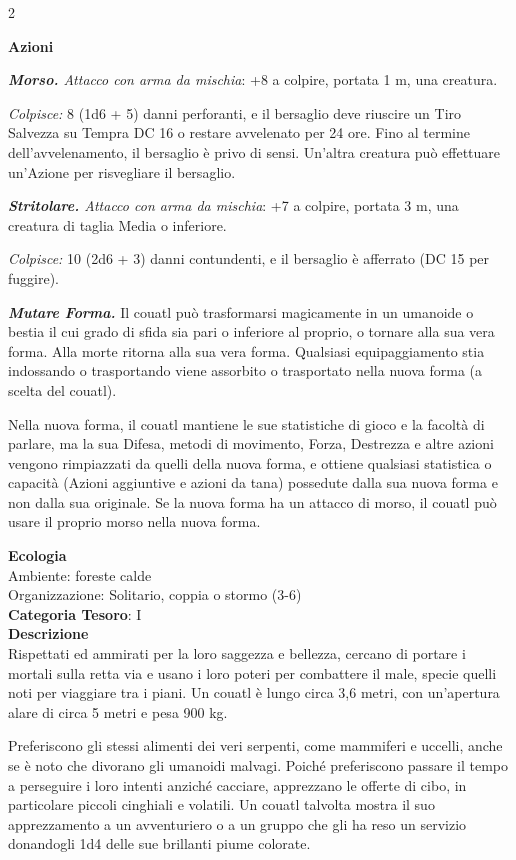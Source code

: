 \begin{multicols}{2}
{\textbf{Azioni}

\emph{\textbf{Morso.} Attacco con arma da mischia}: +8 a colpire, portata 1 m, una creatura.

\emph{Colpisce:} 8 (1d6 + 5) danni perforanti, e il bersaglio deve riuscire un Tiro Salvezza su Tempra DC 16 o restare avvelenato per 24 ore. Fino al termine dell'avvelenamento, il bersaglio è privo di sensi. Un'altra creatura può effettuare un'Azione per risvegliare il bersaglio.

\emph{\textbf{Stritolare.} Attacco con arma da mischia}: +7 a colpire, portata 3 m, una creatura di taglia Media o inferiore.

\emph{Colpisce:} 10 (2d6 + 3) danni contundenti, e il bersaglio è afferrato (DC 15 per fuggire).

\emph{\textbf{Mutare Forma.}} Il couatl può trasformarsi magicamente in un umanoide o bestia il cui grado di sfida sia pari o inferiore al proprio, o tornare alla sua vera forma. Alla morte ritorna alla sua vera forma. Qualsiasi equipaggiamento stia indossando o trasportando viene assorbito o trasportato nella nuova forma (a scelta del couatl).

Nella nuova forma, il couatl mantiene le sue statistiche di gioco e la facoltà di parlare, ma la sua Difesa, metodi di movimento, Forza, Destrezza e altre azioni vengono rimpiazzati da quelli della nuova forma, e ottiene qualsiasi statistica o capacità (Azioni aggiuntive e azioni da tana) possedute dalla sua nuova forma e non dalla sua originale. Se la nuova forma ha un attacco di morso, il couatl può usare il proprio morso nella nuova forma.

\textbf{Ecologia}\\
Ambiente: foreste calde\\
Organizzazione: Solitario, coppia o stormo (3-6)\\
\textbf{Categoria Tesoro}: I\\
\textbf{Descrizione}\\
Rispettati ed ammirati per la loro saggezza e bellezza, cercano di portare i mortali sulla retta via e usano i loro poteri per combattere il male, specie quelli noti per viaggiare tra i piani. Un couatl è lungo circa 3,6 metri, con un'apertura alare di circa 5 metri e pesa 900 kg.

Preferiscono gli stessi alimenti dei veri serpenti, come mammiferi e uccelli, anche se è noto che divorano gli umanoidi malvagi. Poiché preferiscono passare il tempo a perseguire i loro intenti anziché cacciare, apprezzano le offerte di cibo, in particolare piccoli cinghiali e volatili. Un couatl talvolta mostra il suo apprezzamento a un avventuriero o a un gruppo che gli ha reso un servizio donandogli 1d4 delle sue brillanti piume colorate.

}
\end{multicols}
